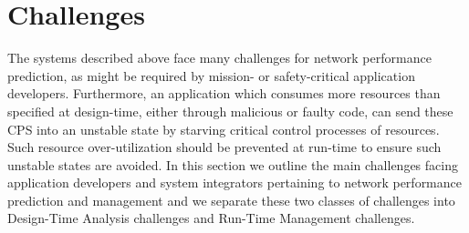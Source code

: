 \section{Challenges}
\label{sec:challenges}
The systems described above face many challenges for network
performance prediction, as might be required by mission- or
safety-critical application developers.  Furthermore, an application
which consumes more resources than specified at design-time, either
through malicious or faulty code, can send these CPS into an unstable
state by starving critical control processes of resources.  Such
resource over-utilization should be prevented at run-time to ensure
such unstable states are avoided.  In this section we outline the main
challenges facing application developers and system integrators
pertaining to network performance prediction and management and we
separate these two classes of challenges into Design-Time Analysis
challenges and Run-Time Management challenges.

